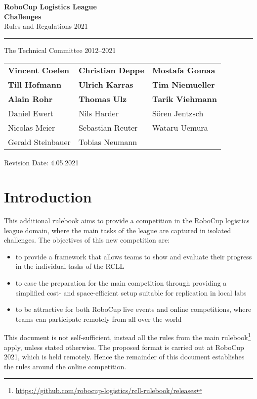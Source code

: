 \documentclass[12pt,twoside]{article}
\begin{document}
\begin{titlepage}
 \vspace*{5cm}
 \begin{center}
  \begin{LARGE}

   {\bf RoboCup Logistics League}\\[2ex]
   {\Large \bf{Challenges}}\\[4ex]
   {\Large Rules and Regulations 2021}\\[4ex]
  \end{LARGE}
  \hrule

  {\LARGE\vspace*{4ex}}
  \begin{Large}
   The Technical Committee 2012--2021\\[6ex]
  \end{Large}
  \begin{tabular}{lll}
   \textbf{Vincent Coelen}&\textbf{Christian Deppe}&\textbf{Mostafa Gomaa}\\
   \textbf{Till Hofmann}&\textbf{Ulrich Karras}&\textbf{Tim Niemueller}\\
   \textbf{Alain Rohr}&\textbf{Thomas Ulz}&\textbf{Tarik Viehmann}\\[.5em]

   Daniel Ewert&Nils Harder&S\"oren Jentzsch\\
   Nicolas Meier&Sebastian Reuter&Wataru Uemura\\
   Gerald Steinbauer&Tobias Neumann\\
  \end{tabular}
  \vfill
  Revision Date: 4.05.2021\\
 \end{center}
\end{titlepage}


\section{Introduction}
\label{sec:intro}
This additional rulebook aims to provide a competition in the RoboCup logistics
league domain, where the main tasks of the league are captured in isolated
challenges.
The objectives of this new competition are:
\begin{itemize}
 \item to provide a framework that allows teams to show and evaluate their
       progress in the individual tasks of the RCLL
 \item to ease the preparation for the main competition through providing a
       simplified cost- and space-efficient setup suitable for replication in
       local labs
 \item to be attractive for both RoboCup live events and online competitions,
       where teams can participate remotely from all over the world
\end{itemize}
This document is not self-sufficient, instead all the rules from the main
rulebook\footnote{\url{https://github.com/robocup-logistics/rcll-rulebook/releases}}
apply, unless stated otherwise.
The proposed format is carried out at RoboCup 2021, which is held remotely.
Hence the remainder of this document establishes the rules around the online
competition.
\end{document}
